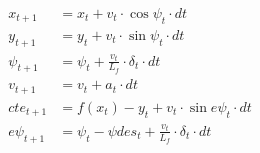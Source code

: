 \documentclass[12pt]{minimal}
\begin{document}
\begin{align*} 
x_{t+1} &= x_t + v_t \cdot \cos{\psi_t} \cdot dt \\
y_{t+1} &= y_t + v_t \cdot \sin{\psi_t} \cdot dt \\
\psi_{t+1} &= \psi_t + \frac{v_t}{L_f} \cdot \delta_t \cdot dt \\
v_{t+1} &= v_t + a_t \cdot dt \\
cte_{t+1} &= f(x_t)-y_t+v_t \cdot \sin{e\psi_t} \cdot dt \\
e\psi_{t+1} &= \psi_t - \psi des_t + \frac{v_t}{L_f} \cdot \delta_t \cdot dt \\
\end{align*}
\end{document}
